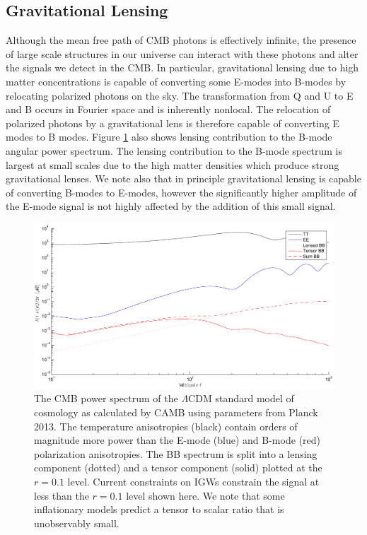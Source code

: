 \documentclass[12pt]{article}
\begin{document}
\subsection{Gravitational Lensing}
Although the mean free path of CMB photons is effectively infinite, the
presence of large scale structures in our universe can interact with these
photons and alter the signals we detect in the CMB. In particular,
gravitational lensing due to high matter concentrations is capable of
converting some E-modes into B-modes by relocating polarized photons on the
sky. The transformation from Q and U to E and B occurs in Fourier space and is
inherently nonlocal. The relocation of polarized photons by a gravitational
lens is therefore capable of converting E modes to B modes.
Figure \ref{fig:theory_aps} also shows lensing contribution to the
B-mode angular power spectrum. The lensing contribution to the B-mode spectrum
is largest at small scales due to the high matter densities which produce
strong gravitational lenses. We note also that in principle gravitational
lensing is capable of converting B-modes to E-modes, however the significantly
higher amplitude of the E-mode signal is not highly affected by the addition
of this small signal.



\begin{figure}[ht]
	\center
	\includegraphics[width=.8\textwidth]{theory_aps.pdf}
	\caption{The CMB power spectrum of the $\Lambda$CDM standard model of
	cosmology as calculated by CAMB using parameters from Planck 2013. The
	temperature anisotropies (black) contain orders of magnitude more power
	than the E-mode (blue) and B-mode (red) polarization anisotropies. The BB
	spectrum is split into a lensing component (dotted) and a tensor component
	(solid) plotted at the $r=0.1$ level. Current constraints on  IGWs
	constrain the signal at less than the $r=0.1$ level shown here. We note
	that some inflationary models predict a tensor to scalar ratio that is
	unobservably small.}
	\label{fig:theory_aps}

\end{figure}
\end{document}
